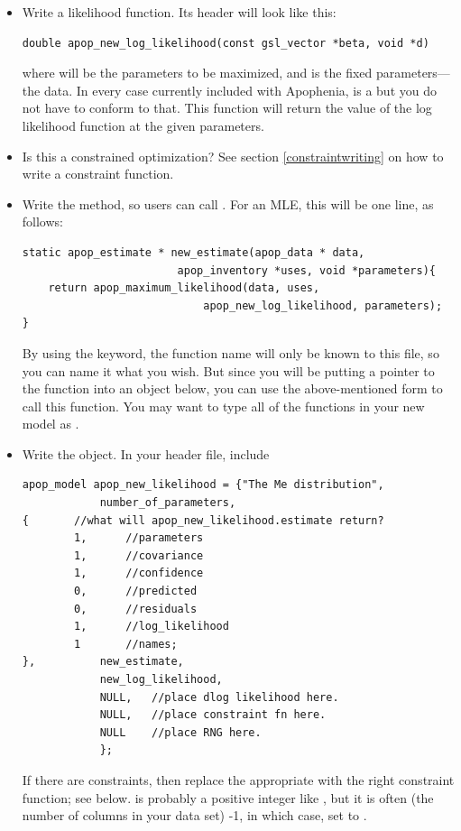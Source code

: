 \begin{itemize}
\item Write a likelihood function. Its header will look like this:
\begin{lstlisting}
double apop_new_log_likelihood(const gsl_vector *beta, void *d)
\end{lstlisting}
where  will be the parameters to be maximized, and  is the fixed parameters---the data. In every case currently included
with Apophenia,  is a  but you do not have to conform
to that. This function will return the value of the log likelihood function at the given parameters.

\item Is this a constrained optimization? See section
\ref{constraintwriting} on how to write a constraint function.

\item Write the  method, so users can call 
. For an MLE, this will be one line,
as follows:
\begin{lstlisting}
static apop_estimate * new_estimate(apop_data * data, 
                        apop_inventory *uses, void *parameters){
    return apop_maximum_likelihood(data, uses, 
                            apop_new_log_likelihood, parameters);
}
\end{lstlisting}
By using the  keyword, the function name will only be
known to this file, so you can name it what you wish.  But since you
will be putting a pointer to the function into an object below, you
can use the above-mentioned 
form to call this function. You may want to type all of the functions in
your new model as .


\item Write the object. In your header file, include 
\begin{lstlisting}
apop_model apop_new_likelihood = {"The Me distribution", 
            number_of_parameters, 
{       //what will apop_new_likelihood.estimate return?
        1,      //parameters 
        1,      //covariance
        1,      //confidence
        0,      //predicted
        0,      //residuals
        1,      //log_likelihood
        1       //names;
},          new_estimate,
            new_log_likelihood, 
            NULL,   //place dlog likelihood here.
            NULL,   //place constraint fn here.
            NULL    //place RNG here.
            };
\end{lstlisting}
If there are constraints, then replace the appropriate  with the right constraint function; see below.
 is probably a positive integer like , but
it is often (the number of columns in your data set) -1, in which case,
set  to .


\end{itemize}
